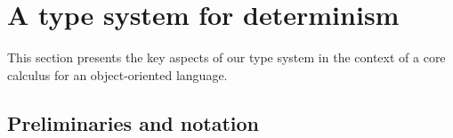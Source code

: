\section{A type system for determinism}\label{design}

This section presents the key aspects of our type system
in the context of a core calculus for an
object-oriented language.


\subsection{Preliminaries and notation}

